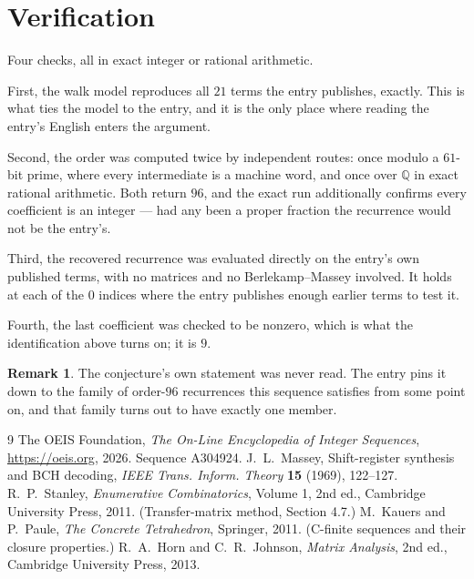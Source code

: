 \documentclass[11pt,a4paper]{article}
\theoremstyle{plain}
\theoremstyle{definition}
\newtheorem{remark}[theorem]{Remark}
\begin{document}
\section{Verification}

Four checks, all in exact integer or rational arithmetic.

First, the walk model reproduces all $21$ terms the entry publishes, exactly. This is
what ties the model to the entry, and it is the only place where reading the entry's English
enters the argument.

Second, the order was computed twice by independent routes: once modulo a $61$-bit prime, where
every intermediate is a machine word, and once over $\mathbb{Q}$ in exact rational arithmetic.
Both return $96$, and the exact run additionally confirms every coefficient is an integer
--- had any been a proper fraction the recurrence would not be the entry's.

Third, the recovered recurrence was evaluated directly on the entry's own published terms, with
no matrices and no Berlekamp--Massey involved. It holds at each of the $0$ indices where
the entry publishes enough earlier terms to test it.

Fourth, the last coefficient was checked to be nonzero, which is what the identification above
turns on; it is $9$.

\begin{remark}
The conjecture's own statement was never read. The entry pins it down to the family of
order-$96$ recurrences this sequence satisfies from some point on, and that family turns
out to have exactly one member.
\end{remark}

\begin{thebibliography}{9}
 The OEIS Foundation, \emph{The On-Line Encyclopedia of Integer
Sequences}, \url{https://oeis.org}, 2026. Sequence A304924.
 J.~L.~Massey, Shift-register synthesis and BCH decoding, \emph{IEEE
Trans. Inform. Theory} \textbf{15} (1969), 122--127.
 R.~P.~Stanley, \emph{Enumerative Combinatorics}, Volume 1, 2nd ed.,
Cambridge University Press, 2011. (Transfer-matrix method, Section 4.7.)
 M.~Kauers and P.~Paule, \emph{The Concrete Tetrahedron}, Springer, 2011.
(C-finite sequences and their closure properties.)
 R.~A.~Horn and C.~R.~Johnson, \emph{Matrix Analysis}, 2nd ed., Cambridge
University Press, 2013.
\end{thebibliography}
\end{document}
